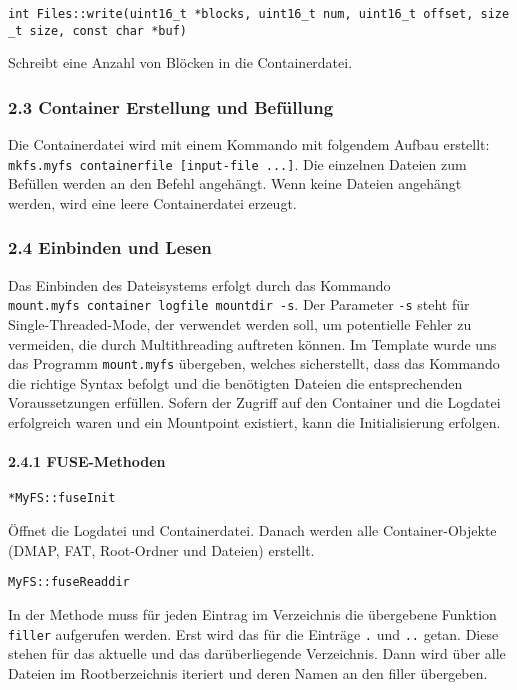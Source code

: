 \documentclass[]{article}
\let\oldparagraph\paragraph
\renewcommand{\paragraph}[1]{\oldparagraph{#1}\mbox{}}
\begin{document}
\texttt{int\ Files::write(uint16\_t\ *blocks,\ uint16\_t\ num,\ uint16\_t\ offset,\ size\_t\ size,\ const\ char\ *buf)}

Schreibt eine Anzahl von Blöcken in die Containerdatei.

\hypertarget{container-erstellung-und-befuxfcllung}{%
\subsubsection{2.3 Container Erstellung und
Befüllung}\label{container-erstellung-und-befuxfcllung}}

Die Containerdatei wird mit einem Kommando mit folgendem Aufbau erstellt: \texttt{mkfs.myfs\ containerfile\ {[}input-file\ ...{]}}. Die
einzelnen Dateien zum Befüllen werden an den Befehl angehängt. Wenn
keine Dateien angehängt werden, wird eine leere Containerdatei erzeugt.

\hypertarget{einbinden-und-lesen}{%
\subsubsection{2.4 Einbinden und Lesen}\label{einbinden-und-lesen}}

Das Einbinden des Dateisystems erfolgt durch das Kommando
\texttt{mount.myfs\ container\ logfile\ mountdir\ -s}. Der Parameter
\texttt{-s} steht für Single-Threaded-Mode, der verwendet werden soll, um
potentielle Fehler zu vermeiden, die durch Multithreading auftreten
können. Im Template wurde uns das Programm \texttt{mount.myfs}
übergeben, welches sicherstellt, dass das Kommando die richtige Syntax
befolgt und die benötigten Dateien die entsprechenden Voraussetzungen erfüllen. Sofern der
Zugriff auf den Container und die Logdatei erfolgreich waren und ein
Mountpoint existiert, kann die Initialisierung erfolgen.

\hypertarget{fuse-methoden}{%
\paragraph{2.4.1 FUSE-Methoden}\label{fuse-methoden}}

\texttt{*MyFS::fuseInit}

Öffnet die Logdatei und Containerdatei. Danach werden alle
Container-Objekte (DMAP, FAT, Root-Ordner und Dateien) erstellt.

\texttt{MyFS::fuseReaddir}

In der Methode muss für jeden Eintrag im Verzeichnis die übergebene
Funktion \texttt{filler} aufgerufen werden. Erst wird das für die
Einträge \texttt{.} und \texttt{..} getan. Diese stehen für das aktuelle
und das darüberliegende Verzeichnis. Dann wird über alle Dateien im
Rootberzeichnis iteriert und deren Namen an den filler übergeben.
\end{document}
